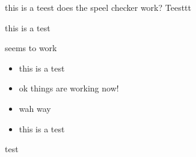 this is a teest
does the speel checker work?
Teesttt

this
is a test


seems to work

\begin{itemize}
    \item this is a test
    \item ok things are working now!
    \item wah way
\end{itemize}

\begin{itemize}
    \item this is a test
\end{itemize}


\usepackage{cleveref}

\usepackage{tikz}

    test   

